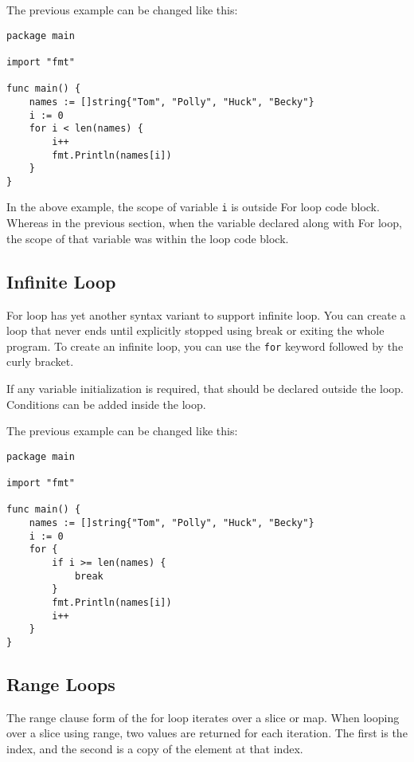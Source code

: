 The previous example can be changed like this:

\begin{lstlisting}[caption=For without initialization and increment]
package main

import "fmt"

func main() {
    names := []string{"Tom", "Polly", "Huck", "Becky"}
    i := 0
    for i < len(names) {
        i++
        fmt.Println(names[i])
    }
}
\end{lstlisting}

In the above example, the scope of variable \texttt{i} is outside For
loop code block.  Whereas in the previous section, when the variable
declared along with For loop, the scope of that variable was within
the loop code block.

\subsection{Infinite Loop}

For loop has yet another syntax variant to support infinite
loop.  You can create a loop that never ends until
explicitly stopped using break or exiting the whole program.  To
create an infinite loop, you can use the \texttt{for} keyword followed
by the curly bracket.

If any variable initialization is required, that should be declared
outside the loop.  Conditions can be added inside the loop.

The previous example can be changed like this:

\begin{lstlisting}[caption=Infinite For loop]
package main

import "fmt"

func main() {
    names := []string{"Tom", "Polly", "Huck", "Becky"}
    i := 0
    for {
        if i >= len(names) {
            break
        }
        fmt.Println(names[i])
        i++
    }
}
\end{lstlisting}

\subsection{Range Loops}

The range clause form of the for loop iterates over
a slice or map.  When looping over a slice using range, two values are
returned for each iteration.  The first is the index, and the second
is a copy of the element at that index.

